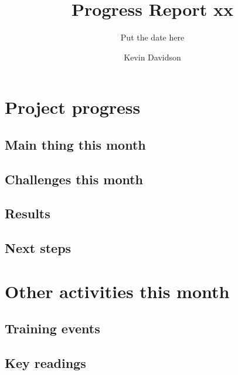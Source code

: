 \documentclass[a4paper, oneside, twocolumn]{scrartcl}
\begin{document}
\author{Kevin Davidson}
\subject{MPhil Geology}
\title{Progress Report xx}
\subtitle{Put the date here}

\maketitle
\raggedright

\section{Project progress}

\subsection{Main thing this month}

\subsection{Challenges this month}

\subsection{Results}

\subsection{Next steps}

\section{Other activities this month}

\subsection{Training events}

\subsection{Key readings}



\end{document}
